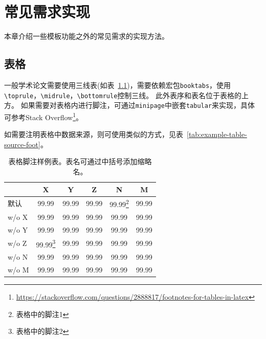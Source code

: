 \chapter{常见需求实现}
本章介绍一些模板功能之外的常见需求的实现方法。
 
\section{表格}
\label{sec:table}

一般学术论文需要使用三线表(如表~\ref{tab:example-table-basic})，需要依赖宏包\verb|booktabs|，使用\verb|\toprule|，\verb|\midrule|，\verb|\bottomrule|控制三线。
此外表序和表名位于表格的上方。
如果需要对表格内进行脚注，可通过\texttt{minipage}中嵌套\texttt{tabular}来实现，具体可参考Stack Overflow\footnote{\url{https://stackoverflow.com/questions/2888817/footnotes-for-tables-in-latex}}。

如需要注明表格中数据来源，则可使用类似的方式，见表~\ref{tab:example-table-source-foot}。

\begin{table}[htb]
    \centering
    \begin{minipage}[t]{0.55\linewidth} %
        \caption[表格脚注样例表]{表格脚注样例表。表名可通过中括号添加缩略名。}
        \label{tab:example-table-basic}
        \begin{small}
        \begin{tabular}{@{}lccccc@{}}
         \toprule[1.5pt]
         & \textbf{X} & \textbf{Y} & \textbf{Z} & \textbf{N} & \textbf{M} \\
         \midrule[1pt]
            默认        & 99.99 & 99.99 & 99.99 & 99.99\footnote{表格中的脚注1} & 99.99 \\
          \quad w/o X   & 99.99 & 99.99 & 99.99 & 99.99 & 99.99 \\
          \quad w/o Y   & 99.99 & 99.99 & 99.99 & 99.99 & 99.99 \\
          \quad w/o Z   & 99.99\footnote{表格中的脚注2} & 99.99 & 99.99 & 99.99 & 99.99 \\
          \quad w/o N   & 99.99 & 99.99 & 99.99 & 99.99 & 99.99 \\
          \quad w/o M   & 99.99 & 99.99 & 99.99 & 99.99 & 99.99 \\
          \bottomrule[1.5pt]
        \end{tabular}
        \end{small}
    \end{minipage}
\end{table}

